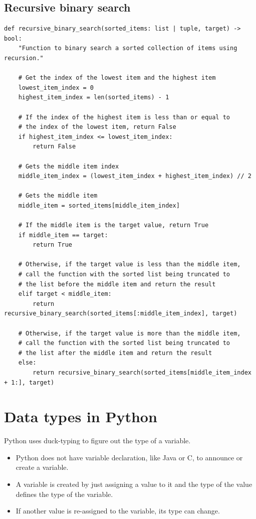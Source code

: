 \documentclass[11pt]{article}
\begin{document}
\subsection{Recursive binary search}
\label{sec:orgfa5ae1f}
\begin{verbatim}
def recursive_binary_search(sorted_items: list | tuple, target) -> bool:
    "Function to binary search a sorted collection of items using recursion."

    # Get the index of the lowest item and the highest item
    lowest_item_index = 0
    highest_item_index = len(sorted_items) - 1

    # If the index of the highest item is less than or equal to
    # the index of the lowest item, return False
    if highest_item_index <= lowest_item_index:
        return False

    # Gets the middle item index
    middle_item_index = (lowest_item_index + highest_item_index) // 2

    # Gets the middle item
    middle_item = sorted_items[middle_item_index]

    # If the middle item is the target value, return True
    if middle_item == target:
        return True

    # Otherwise, if the target value is less than the middle item,
    # call the function with the sorted list being truncated to
    # the list before the middle item and return the result
    elif target < middle_item:
        return recursive_binary_search(sorted_items[:middle_item_index], target)

    # Otherwise, if the target value is more than the middle item,
    # call the function with the sorted list being truncated to
    # the list after the middle item and return the result
    else:
        return recursive_binary_search(sorted_items[middle_item_index + 1:], target)
\end{verbatim}

 \newpage

\section{Data types in Python}
\label{sec:org1cb42fd}
Python uses duck-typing to figure out the type of a variable.
\begin{itemize}
\item Python does not have variable declaration, like Java or C, to announce or create a variable.
\item A variable is created by just assigning a value to it and the type of the value defines the type of the variable.
\item If another value is re-assigned to the variable, its type can change.
\end{itemize}
\end{document}
